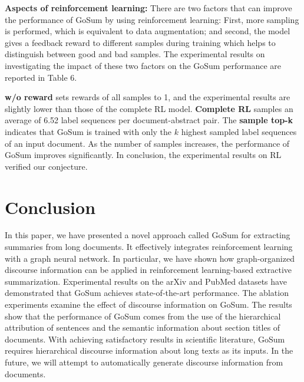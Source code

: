 \noindent \textbf{Aspects of reinforcement learning:}
There are two factors that can improve the performance of GoSum by using reinforcement learning: First, more sampling is performed, which is equivalent to data augmentation; and second, the model gives a feedback reward to different samples during training which helps to distinguish between good and bad samples. The experimental results on investigating the impact of these two factors on the GoSum performance are reported in Table 6. 

\textbf{w/o reward} sets rewards of all samples to 1, and the experimental results are slightly lower than those of the complete RL model.
\textbf{Complete RL} samples an average of 6.52 label sequences per document-abstract pair.
The \textbf{sample top-k} indicates that GoSum is trained with only the $k$ highest sampled label sequences of an input document.
As the number of samples increases, the  performance of GoSum improves significantly. In conclusion, the experimental results on RL verified our conjecture.

\section{Conclusion}
\label{sec:conclude}

In this paper, we have presented a novel approach called GoSum for extracting summaries from long documents. It effectively integrates reinforcement learning with a graph neural network. In particular, we have shown how graph-organized discourse information can  be applied in reinforcement learning-based extractive summarization.
Experimental results on the arXiv and PubMed datasets have demonstrated that GoSum achieves state-of-the-art performance. The ablation experiments examine the effect of discourse information on GoSum. The results show that the performance of GoSum comes from the use of the hierarchical attribution of sentences and the semantic information about section titles of documents.
With achieving satisfactory results in scientific literature, GoSum requires  hierarchical discourse information about long texts as its inputs. In the future, we will attempt to automatically generate discourse information from documents.

